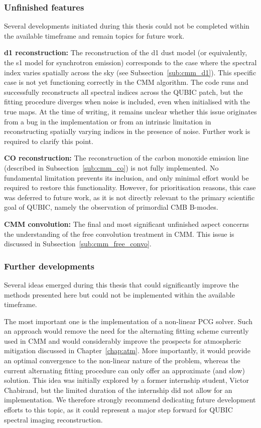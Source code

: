\documentclass[../../thesis.tex]{subfiles}
\begin{document}
\subsubsection{Unfinished features}

Several developments initiated during this thesis could not be completed within the available timeframe and remain topics for future work.

\textbf{d1 reconstruction:} The reconstruction of the d1 dust model (or equivalently, the s1 model for synchrotron emission) corresponds to the case where the spectral index varies spatially across the sky (see Subsection~\ref{sub:cmm_d1}). This specific case is not yet functioning correctly in the CMM algorithm. The code runs and successfully reconstructs all spectral indices across the QUBIC patch, but the fitting procedure diverges when noise is included, even when initialised with the true maps. At the time of writing, it remains unclear whether this issue originates from a bug in the implementation or from an intrinsic limitation in reconstructing spatially varying indices in the presence of noise. Further work is required to clarify this point.

\textbf{CO reconstruction:} The reconstruction of the carbon monoxide emission line (described in Subsection~\ref{sub:cmm_co}) is not fully implemented. No fundamental limitation prevents its inclusion, and only minimal effort would be required to restore this functionality. However, for prioritisation reasons, this case was deferred to future work, as it is not directly relevant to the primary scientific goal of QUBIC, namely the observation of primordial CMB B-modes.

\textbf{CMM convolution:} The final and most significant unfinished aspect concerns the understanding of the free convolution treatment in CMM. This issue is discussed in Subsection~\ref{sub:cmm_free_convo}.

\subsubsection{Further developments}

Several ideas emerged during this thesis that could significantly improve the methods presented here but could not be implemented within the available timeframe.

The most important one is the implementation of a non-linear PCG solver. Such an approach would remove the need for the alternating fitting scheme currently used in CMM and would considerably improve the prospects for atmospheric mitigation discussed in Chapter~\ref{chap:atm}. More importantly, it would provide an optimal convergence to the non-linear nature of the problem, whereas the current alternating fitting procedure can only offer an approximate (and slow) solution. This idea was initially explored by a former internship student, Victor Chabirand, but the limited duration of the internship did not allow for an implementation. We therefore strongly recommend dedicating future development efforts to this topic, as it could represent a major step forward for QUBIC spectral imaging reconstruction.
\end{document}

